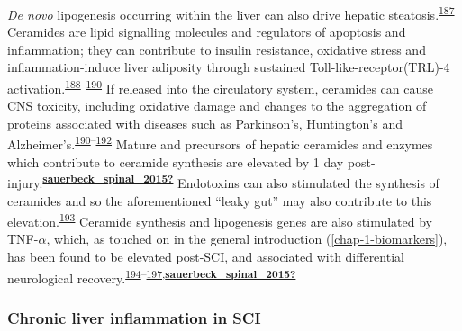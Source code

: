 \documentclass[
]{article}
\begin{document}
\emph{De novo} lipogenesis occurring within the liver can also drive hepatic steatosis.\textsuperscript{\protect\hyperlink{ref-lavoie_regulation_2006}{187}}
Ceramides are lipid signalling molecules and regulators of apoptosis and inflammation; they can contribute to insulin resistance, oxidative stress and inflammation-induce liver adiposity through sustained Toll-like-receptor(TRL)-4 activation.\textsuperscript{\protect\hyperlink{ref-schilling_palmitate_2013}{188}--\protect\hyperlink{ref-pagadala_role_2012}{190}}
If released into the circulatory system, ceramides can cause CNS toxicity, including oxidative damage and changes to the aggregation of proteins associated with diseases such as Parkinson's, Huntington's and Alzheimer's.\textsuperscript{\protect\hyperlink{ref-pagadala_role_2012}{190}--\protect\hyperlink{ref-czubowicz_role_2019}{192}}
Mature and precursors of hepatic ceramides and enzymes which contribute to ceramide synthesis are elevated by 1 day post-injury.\textsuperscript{\protect\hyperlink{ref-sauerbeck_spinal_2015}{\textbf{sauerbeck\_spinal\_2015?}}}
Endotoxins can also stimulated the synthesis of ceramides and so the aforementioned ``leaky gut'' may also contribute to this elevation.\textsuperscript{\protect\hyperlink{ref-chang_endotoxin_2011}{193}}
Ceramide synthesis and lipogenesis genes are also stimulated by TNF-\(\alpha\), which, as touched on in the general introduction (\ref{chap-1-biomarkers}), has been found to be elevated post-SCI, and associated with differential neurological recovery.\textsuperscript{\protect\hyperlink{ref-davies_clinical_2007}{194}--\protect\hyperlink{ref-bikman_role_2012}{197},\protect\hyperlink{ref-sauerbeck_spinal_2015}{\textbf{sauerbeck\_spinal\_2015?}}}

\hypertarget{chronic-liver-inflammation-in-sci}{%
\subsubsection{Chronic liver inflammation in SCI}\label{chronic-liver-inflammation-in-sci}}
\end{document}
